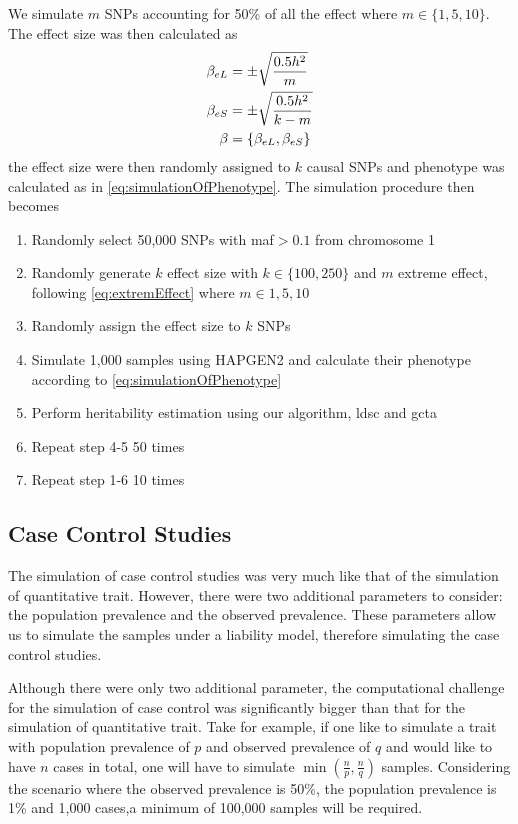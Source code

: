 		We simulate $m$ \glspl{SNP} accounting for 50\% of all the effect where $m\in\{1,5,10\}$.
		The effect size was then calculated as
		\begin{align}
		\beta_{eL} &= \pm\sqrt{\frac{0.5h^2}{m}} \notag\\
		\beta_{eS} &= \pm\sqrt{\frac{0.5h^2}{k-m}} \notag\\
		\beta &= \{\beta_{eL}, \beta_{eS}\}
		\label{eq:extremEffect}
		\end{align}
		the effect size were then randomly assigned to $k$ causal \glspl{SNP} and phenotype was calculated as in \cref{eq:simulationOfPhenotype}.
		The simulation procedure then becomes
		\begin{enumerate}
			\item Randomly select 50,000 \glspl{SNP} with \gls{maf}$>0.1$ from chromosome 1
			\item Randomly generate $k$ effect size with $k \in \{100,250\}$ and $m$ extreme effect, following \cref{eq:extremEffect} where $m\in{1,5,10}$
			\item Randomly assign the effect size to $k$ \glspl{SNP}
			\item Simulate 1,000 samples using HAPGEN2 and calculate their phenotype according to \cref{eq:simulationOfPhenotype}
			\item Perform heritability estimation using our algorithm, \gls{ldsc} and \gls{gcta}
			\item Repeat step 4-5 50 times
			\item Repeat step 1-6 10 times
		\end{enumerate}
		
		\subsection{Case Control Studies}
		The simulation of case control studies was very much like that of the simulation of quantitative trait. 
		However, there were two additional parameters to consider: the population prevalence and the observed prevalence.
		These parameters allow us to simulate the samples under a liability model, therefore simulating the case control studies.

		Although there were only two additional parameter, the computational challenge for the simulation of case control was significantly bigger than that for the simulation of quantitative trait.
		Take for example, if one like to simulate a trait with population prevalence of $p$ and observed prevalence  of $q$ and would like to have $n$ cases in total, one will have to simulate $\min(\frac{n}{p}, \frac{n}{q})$ samples.
		Considering the scenario where the observed prevalence is 50\%, the population prevalence is 1\% and 1,000 cases,a minimum of 100,000 samples will be required.
		
